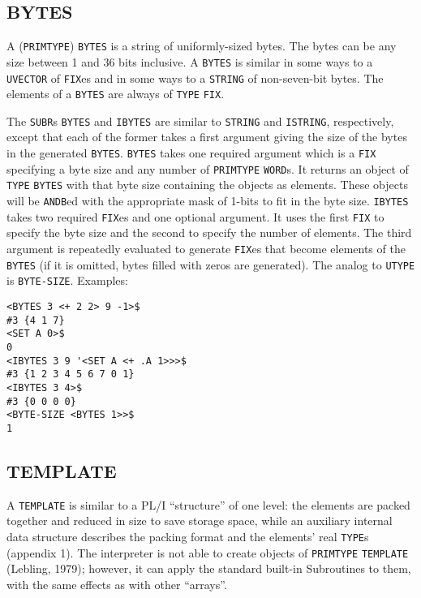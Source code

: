 \documentclass[a4paper]{scrbook}
\begin{document}
\subsection{BYTES}\label{bytes-1}

 A (\texttt{PRIMTYPE}) \texttt{BYTES} is a string of uniformly-sized bytes. The bytes can be
any size between 1 and 36 bits inclusive. A \texttt{BYTES} is similar in some ways to a
\texttt{UVECTOR} of \texttt{FIX}es and in some ways to a \texttt{STRING} of
non-seven-bit bytes. The elements of a \texttt{BYTES} are always of \texttt{TYPE} \texttt{FIX}.

The \texttt{SUBR}s \texttt{BYTES} and \texttt{IBYTES} are similar to \texttt{STRING} and
\texttt{ISTRING}, respectively, except that each of the former takes a first argument giving the size of the bytes in the
generated \texttt{BYTES}. \texttt{BYTES} takes one required argument which is a \texttt{FIX} specifying a byte size and any
number of \texttt{PRIMTYPE} \texttt{WORD}s. It returns an object of \texttt{TYPE} \texttt{BYTES} with that byte size
containing the objects as elements. These objects will be \texttt{ANDB}ed  with the appropriate mask
of 1-bits to fit in the byte size. \texttt{IBYTES} takes two required \texttt{FIX}es and one optional argument. It uses the
first \texttt{FIX} to specify the byte size and the second to specify the number of elements. The third argument is
repeatedly evaluated to generate \texttt{FIX}es that become elements of the \texttt{BYTES} (if it is omitted, bytes filled
with zeros are generated). The analog to \texttt{UTYPE} is \texttt{BYTE-SIZE}. Examples:

\begin{verbatim}
<BYTES 3 <+ 2 2> 9 -1>$
#3 {4 1 7}
<SET A 0>$
0
<IBYTES 3 9 '<SET A <+ .A 1>>>$
#3 {1 2 3 4 5 6 7 0 1}
<IBYTES 3 4>$
#3 {0 0 0 0}
<BYTE-SIZE <BYTES 1>>$
1
\end{verbatim}

\subsection{TEMPLATE}\label{template-1}

 A \texttt{TEMPLATE} is similar to a PL/I ``structure'' of one level: the elements are
packed together and reduced in size to save storage space, while an auxiliary internal data structure describes the packing
format and the elements' real \texttt{TYPE}s (appendix 1). The interpreter is not able to create objects of
\texttt{PRIMTYPE} \texttt{TEMPLATE} (Lebling, 1979); however, it can apply the standard built-in Subroutines to them, with
the same effects as with other ``arrays''.
\end{document}
